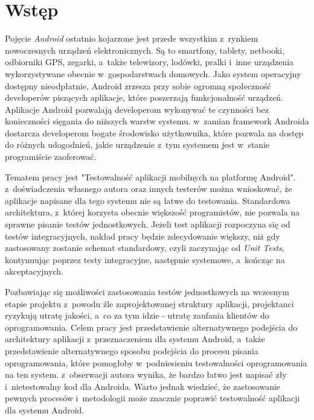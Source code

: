 \chapter{Wstęp}
\label{wstep}

Pojęcie \textit{Android} ostatnio kojarzone jest przede wszystkim z~rynkiem nowoczesnych urządzeń elektronicznych. Są to smartfony, tablety, netbooki, odbiorniki GPS, zegarki, a~także telewizory, lodówki, pralki i~inne urządzenia wykorzystywane obecnie w~gospodarstwach domowych. Jako system operacyjny dostępny nieodpłatnie, Android zrzesza przy sobie ogromną społeczność developerów piszących aplikacje, które poszerzają funkcjonalność urządzeń.  Aplikacje Android pozwalają developerom wykonywać te czynności bez konieczności sięgania do niższych warstw systemu. w~zamian framework Androida dostarcza developerom bogate środowisko użytkownika, które pozwala na dostęp do różnych udogodnień, jakie urządzenie z~tym systemem jest w~stanie programiście zaoferować. 

Tematem pracy jest "Testowalność aplikacji mobilnych na platformę Android". z~doświadczenia własnego autora oraz innych testerów można wnioskować, że aplikacje napisane dla tego systemu nie są łatwe do testowania. Standardowa architektura, z~której korzysta obecnie większość programistów, nie pozwala na sprawne pisanie testów jednostkowych. Jeżeli test aplikacji rozpoczyna się od testów integracyjnych, nakład pracy będzie zdecydowanie większy, niż gdy zastosowany zostanie schemat standardowy, czyli zaczynając od \textit{Unit Tests}, kontynuując poprzez testy integracyjne, następnie systemowe, a~kończąc na akceptacyjnych. 

Pozbawiając się możliwości zastosowania testów jednostkowych na wczesnym etapie projektu z~powodu źle zaprojektowanej struktury aplikacji, projektanci ryzykują utratę jakości, a~co za tym idzie - utratę zaufania klientów do oprogramowania. Celem pracy jest przedstawienie alternatywnego podejścia do architektury aplikacji z~przeznaczeniem dla systemu Android, a~także przedstawienie alternatywnego sposobu podejścia do procesu pisania oprogramowania, które pomogłoby w~podniesieniu testowalności oprogramowania na ten system. z~obserwacji autora wynika, że bardzo łatwo jest napisać zły i~nietestowalny kod dla Androida. Warto jednak wiedzieć, że zastosowanie pewnych procesów i~metodologii może znacznie poprawić testowalność aplikacji dla systemu Android. 

